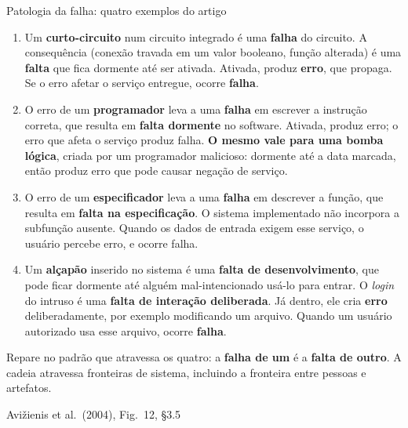 \documentclass{beamer}
\newcommand{\sect}[1]{\par\smallskip\hfill{\tiny\color{black!55}Avi\v{z}ienis et al.\ (2004), #1}}
\begin{document}
\begin{frame}{Patologia da falha: quatro exemplos do artigo}
    \scriptsize
    \begin{enumerate}
        \item Um \textbf{curto-circuito} num circuito integrado \'e uma \textbf{falha} do circuito. A consequ\^encia (conex\~ao travada em um valor booleano, fun\c{c}\~ao alterada) \'e uma \textbf{falta} que fica dormente at\'e ser ativada. Ativada, produz \textbf{erro}, que propaga. Se o erro afetar o servi\c{c}o entregue, ocorre \textbf{falha}.
        \medskip
        \item O erro de um \textbf{programador} leva a uma \textbf{falha} em escrever a instru\c{c}\~ao correta, que resulta em \textbf{falta dormente} no software. Ativada, produz erro; o erro que afeta o servi\c{c}o produz falha. \textbf{O mesmo vale para uma bomba l\'ogica}, criada por um programador malicioso: dormente at\'e a data marcada, ent\~ao produz erro que pode causar nega\c{c}\~ao de servi\c{c}o.
        \medskip
        \item O erro de um \textbf{especificador} leva a uma \textbf{falha} em descrever a fun\c{c}\~ao, que resulta em \textbf{falta na especifica\c{c}\~ao}. O sistema implementado n\~ao incorpora a subfun\c{c}\~ao ausente. Quando os dados de entrada exigem esse servi\c{c}o, o usu\'ario percebe erro, e ocorre falha.
        \medskip
        \item Um \textbf{al\c{c}ap\~ao} inserido no sistema \'e uma \textbf{falta de desenvolvimento}, que pode ficar dormente at\'e algu\'em mal-intencionado us\'a-lo para entrar. O \textit{login} do intruso \'e uma \textbf{falta de intera\c{c}\~ao deliberada}. J\'a dentro, ele cria \textbf{erro} deliberadamente, por exemplo modificando um arquivo. Quando um usu\'ario autorizado usa esse arquivo, ocorre \textbf{falha}.
    \end{enumerate}
    \smallskip
    \begin{ancora}
        \scriptsize
        Repare no padr\~ao que atravessa os quatro: a \textbf{falha de um} \'e a \textbf{falta de outro}. A cadeia atravessa fronteiras de sistema, incluindo a fronteira entre pessoas e artefatos.
    \end{ancora}
    \sect{Fig.\ 12, \S3.5}
\end{frame}
\end{document}
